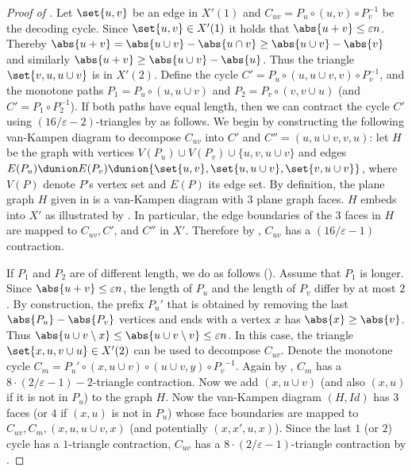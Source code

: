 \begin{proof}[Proof of ]
    Let \(\set{u,v}\) be an edge in $X'(1)$ and \(C_{uv} = P_u\circ (u,v) \circ P_v^{-1}\) be the decoding cycle. Since \(\set{u,v} \in X'(1)\) it holds that \(\abs{u + v} \leq \varepsilon n\). Thereby \(\abs{u + v} = \abs{u \cup v} - \abs{u \cap v} \geq \abs{u \cup v} - \abs{v}\) and similarly \(\abs{u + v} \geq \abs{u \cup v} - \abs{u}\). Thus the triangle \(\set{v,u,u \cup v}\) is in \(X'(2)\). 
    Define the cycle \(C'=P_u \circ (u,u\cup v,v) \circ P_{v}^{-1}\), and the monotone paths \(P_1 = P_u \circ (u,u \cup v)\) and \(P_2 = P_v \circ (v,v \cup u)\) (and \(C' = P_1 \circ P_2^{-1}\)). 
    If both paths have equal length, then we can contract the cycle $C'$ using \((16/\varepsilon - 2)\)-triangles by  as follows. We begin by constructing the following van-Kampen diagram  to decompose $C_{uv}$ into $C'$ and $C'' = (u,u\cup v, v, u)$: let $H$ be the graph with vertices $V(P_u)\cup V(P_v) \cup \{u,v,u\cup v\}$ and edges $E(P_u)\dunion E(P_v) \dunion \{\set{u,v},\set{u,u\cup v}, \set{v,u\cup v}\}$, where \(V(P)\) denote  \(P\)'s vertex set and \(E(P)\) its edge set. By definition, the plane graph $H$ given in  is a van-Kampen diagram with $3$ plane graph faces. 
    $H$ embeds into $X'$ as illustrated by . In particular, the edge boundaries of the $3$ faces in $H$ are mapped to $ C_{uv}, C'$, and $ C''$ in $X'$. Therefore by , $C_{uv}$ has a \((16/\varepsilon - 1)\) contraction.
    
    If $P_1$ and $P_2$ are of different length, we do as follows (). Assume that \(P_1\) is longer. Since $\abs{u+v} \le \varepsilon n$, the length of $P_u$ and the length of $P_v$ differ by at most $2$. By construction, the prefix \(P_u'\) that is obtained by removing the last $\abs{P_u} - \abs{P_v}$ vertices and ends with a vertex \(x\) has \(\abs{x} \ge \abs{v}\). Thus $\abs{u\cup v \setminus x} \le \abs{u \cup v\setminus v} \le \varepsilon n$. In this case, the triangle \(\set{x,u,v \cup u} \in X'(2)\) can be used to decompose \(C_{uv}\). Denote the monotone cycle $C_m = P_u'\circ (x,u\cup v)\circ (u\cup v,y)\circ {P_v}^{-1}$. Again by , $C_m$ has a \(8 \cdot (2/\varepsilon - 1) -2 \)-triangle contraction. 
    Now we add $(x,u\cup v)$ (and also $(x,u)$ if it is not in $P_u$) to the graph $H$. Now the van-Kampen diagram $(H,Id)$ has $3$ faces (or $4$ if $(x,u)$ is not in $P_u$) whose face boundaries are mapped to $C_{uv},C_m,  (x,u,u\cup v,x)$ (and potentially $(x,x',u,x)$). Since the last $1$ (or $2$) cycle has a $1$-triangle contraction, $C_{uv}$ has a \(8 \cdot (2/\varepsilon - 1)\)-triangle contraction by .

\end{proof}

